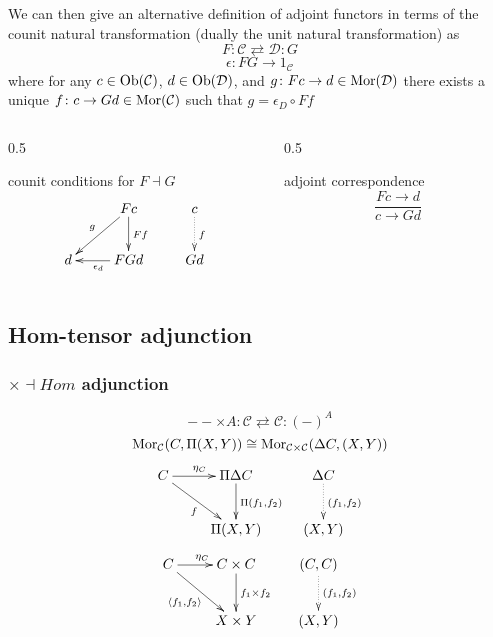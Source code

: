 \begin{frame}
We can then give an alternative definition of adjoint functors in terms of the counit natural transformation (dually the unit natural transformation) as
$$
F \colon \mathcal{C} \rightleftarrows \mathcal{D} \colon G
$$
$$
\epsilon \colon FG \rightarrow 1_{\mathcal{C}}
$$
where for any $c \in \mathop{\rm Ob}\nolimits (\mathcal{C})$, $d \in \mathop{\rm Ob}\nolimits (\mathcal{D})$, and $g \colon Fc \rightarrow d \in \mathop{\rm Mor}\nolimits(\mathcal{D})$ there exists a unique $f \colon c \rightarrow Gd \in \mathop{\rm Mor}\nolimits(\mathcal{C})$ such that $g = \epsilon_D \circ Ff$	
\begin{columns}[t]
    \begin{column}{0.5\framewidth}
\begin{block}{counit conditions for $F \dashv G$}
$$
			\xymatrix{
			& F c \ar[d]^{F f} \ar[dl]_{g} & c \ar@{.>}[d]^{f}\\
			d & F G d \ar[l]^{\epsilon_d} & G d}
$$
\end{block}
    \end{column}
    \begin{column}{0.5\framewidth}
		     \begin{block}{adjoint correspondence}
		\abovedisplayskip=0pt
		$$
			\frac{Fc \rightarrow d}{c \rightarrow Gd}
		$$
		\end{block}
    \end{column}
\end{columns}
\end{frame}

\subsection{Hom-tensor adjunction}
\begin{frame}
\frametitle{$\times \dashv Hom$ adjunction}
$$ -- \times A: \mathcal{C} \rightleftarrows \mathcal{C}: (-)^A$$
$$\mathop{\rm Mor}\nolimits_{\mathcal{C}}(C, \Pi (X,Y)) \cong  \mathop{\rm Mor}\nolimits_{\mathcal{C} \times \mathcal{C}}(\Delta C, (X,Y))$$
			$$
			\xymatrix{
			C \ar[r]^{\eta_C} \ar[dr]_{f} & \Pi \Delta C \ar[d]^{\Pi (f_1, f_2)} & \Delta C \ar@{.>}[d]^{(f_1,f_2)}\\
			& \Pi (X,Y) & (X,Y)}
			$$
			$$
			\xymatrix{
			C \ar[r]^{\eta_C} \ar[dr]_{\langle f_1, f_2 \rangle} & C \times C \ar[d]^{f_1 \times f_2} & (C,C) \ar@{.>}[d]^{(f_1,f_2)}\\
			& X \times Y & (X,Y)}
			$$
\end{frame}

